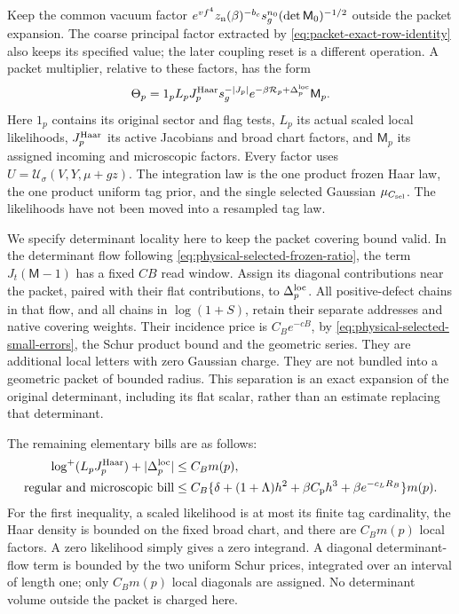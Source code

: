 \documentclass[11pt,reqno]{amsart}
\numberwithin{equation}{section}
\theoremstyle{definition}
\theoremstyle{remark}
\begin{document}
Keep the common vacuum factor
\(e^{vf^4}z_{\rm n}(\beta)^{-b_c}s_g^{n_0}
(\det\mathsf M_0)^{-1/2}\) outside the packet expansion.
The coarse principal factor extracted by
\eqref{eq:packet-exact-row-identity} also keeps its specified
value; the later coupling reset is a different operation.
A packet multiplier, relative to these factors, has the form
\begin{equation}
 \Theta_p=1_p L_p J_p^{\rm Haar}s_g^{-|J_p|}
                e^{-\beta\mathcal R_p+\Delta_p^{\rm loc}}\mathsf M_p.
 \label{eq:packet-retained-multiplier}
\end{equation}
Here \(1_p\) contains its original sector and flag tests,
\(L_p\) its actual scaled local likelihoods,
\(J_p^{\rm Haar}\) its active Jacobians and broad chart factors,
and \(\mathsf M_p\) its assigned incoming and microscopic
factors. Every factor uses
\(U=\mathcal U_\sigma(V,Y,\mu+gz)\).
The integration law is the one product frozen Haar law, the
one product uniform tag prior, and the single selected Gaussian
\(\mu_{C_{\rm sel}}\). The likelihoods have not been moved
into a resampled tag law.

We specify determinant locality here to keep the packet covering
bound valid. In the determinant flow following
\eqref{eq:physical-selected-frozen-ratio}, the term
\(J_t(\mathsf M-1)\) has a fixed \(CB\) read window.
Assign its diagonal contributions near the packet, paired with
their flat contributions, to \(\Delta_p^{\rm loc}\).
All positive-defect chains in that flow, and all chains in
\(\log(1+S)\), retain their separate addresses and native
covering weights. Their incidence price is \(C_Be^{-cB}\),
by \eqref{eq:physical-selected-small-errors}, the Schur product
bound and the geometric series. They are additional local
letters with zero Gaussian charge. They are not bundled into
a geometric packet of bounded radius. This separation is an
exact expansion of the original determinant, including its flat
scalar, rather than an estimate replacing that determinant.

The remaining elementary bills are as follows:
\begin{equation}
 \begin{split}
 \log^+(L_pJ_p^{\rm Haar})+|\Delta_p^{\rm loc}|&\le C_Bm(p),\\
 \text{regular and microscopic bill}
    &\le C_B\{\delta+(1+\Lambda)h^2
                       +\beta C_{\rm p}h^3+\beta e^{-c_LR_B}\}m(p).
 \end{split}
 \label{eq:packet-local-bills}
\end{equation}
For the first inequality, a scaled likelihood is at most its
finite tag cardinality, the Haar density is bounded on the
fixed broad chart, and there are \(C_Bm(p)\) local factors.
A zero likelihood simply gives a zero integrand. A diagonal
determinant-flow term is bounded by the two uniform Schur
prices, integrated over an interval of length one; only
\(C_Bm(p)\) local diagonals are assigned. No determinant
volume outside the packet is charged here.
\end{document}

